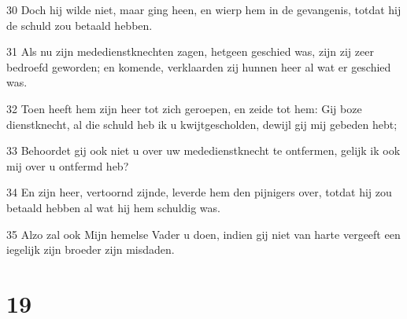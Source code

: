 \par 30 Doch hij wilde niet, maar ging heen, en wierp hem in de gevangenis, totdat hij de schuld zou betaald hebben.
\par 31 Als nu zijn mededienstknechten zagen, hetgeen geschied was, zijn zij zeer bedroefd geworden; en komende, verklaarden zij hunnen heer al wat er geschied was.
\par 32 Toen heeft hem zijn heer tot zich geroepen, en zeide tot hem: Gij boze dienstknecht, al die schuld heb ik u kwijtgescholden, dewijl gij mij gebeden hebt;
\par 33 Behoordet gij ook niet u over uw mededienstknecht te ontfermen, gelijk ik ook mij over u ontfermd heb?
\par 34 En zijn heer, vertoornd zijnde, leverde hem den pijnigers over, totdat hij zou betaald hebben al wat hij hem schuldig was.
\par 35 Alzo zal ook Mijn hemelse Vader u doen, indien gij niet van harte vergeeft een iegelijk zijn broeder zijn misdaden.

\chapter{19}

